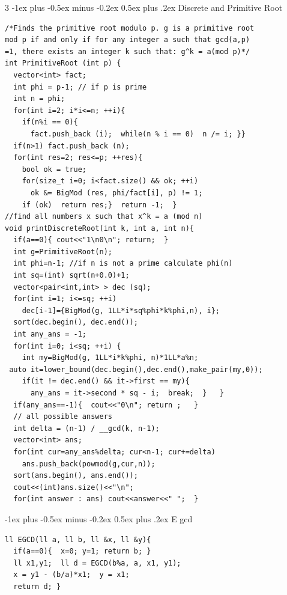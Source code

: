 \documentclass[8pt,a4paper,onesided]{article}
\makeatletter
\renewcommand{\subsection}{\@startsection{subsection}{2}{0mm}
    {-1ex plus -0.5ex minus -0.2ex} %
    {0.5ex plus .2ex}                %
    {\normalfont\large\bfseries}}    %
\makeatother
\begin{document}
\begin{multicols}{3}
\subsection{Discrete and Primitive Root}
\begin{verbatim}
/*Finds the primitive root modulo p. g is a primitive root 
mod p if and only if for any integer a such that gcd(a,p)
=1, there exists an integer k such that: g^k = a(mod p)*/
int PrimitiveRoot (int p) {
  vector<int> fact;
  int phi = p-1; // if p is prime
  int n = phi;
  for(int i=2; i*i<=n; ++i){
    if(n%i == 0){
      fact.push_back (i);  while(n % i == 0)  n /= i; }}
  if(n>1) fact.push_back (n);
  for(int res=2; res<=p; ++res){
    bool ok = true;
    for(size_t i=0; i<fact.size() && ok; ++i)
      ok &= BigMod (res, phi/fact[i], p) != 1;
    if (ok)  return res;}  return -1;  }
//find all numbers x such that x^k = a (mod n)
void printDiscreteRoot(int k, int a, int n){
  if(a==0){ cout<<"1\n0\n"; return;  }
  int g=PrimitiveRoot(n);
  int phi=n-1; //if n is not a prime calculate phi(n)
  int sq=(int) sqrt(n+0.0)+1;
  vector<pair<int,int> > dec (sq);
  for(int i=1; i<=sq; ++i)
    dec[i-1]={BigMod(g, 1LL*i*sq%phi*k%phi,n), i};
  sort(dec.begin(), dec.end());
  int any_ans = -1;
  for(int i=0; i<sq; ++i) {
    int my=BigMod(g, 1LL*i*k%phi, n)*1LL*a%n;
 auto it=lower_bound(dec.begin(),dec.end(),make_pair(my,0));
    if(it != dec.end() && it->first == my){
      any_ans = it->second * sq - i;  break;  }   }
  if(any_ans==-1){  cout<<"0\n"; return ;   }
  // all possible answers
  int delta = (n-1) / __gcd(k, n-1);
  vector<int> ans;
  for(int cur=any_ans%delta; cur<n-1; cur+=delta)
    ans.push_back(powmod(g,cur,n));
  sort(ans.begin(), ans.end());
  cout<<(int)ans.size()<<"\n";
  for(int answer : ans) cout<<answer<<" ";  }
\end{verbatim}
\subsection{E gcd}
\begin{verbatim}
ll EGCD(ll a, ll b, ll &x, ll &y){
  if(a==0){  x=0; y=1; return b; }
  ll x1,y1;  ll d = EGCD(b%a, a, x1, y1);
  x = y1 - (b/a)*x1;  y = x1;
  return d; }
\end{verbatim}

\end{multicols}
\end{document}
